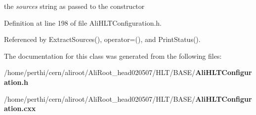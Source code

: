 the {\em sources\/} string as passed to the constructor 

Definition at line 198 of file Ali\-HLTConfiguration.h.

Referenced by Extract\-Sources(), operator=(), and Print\-Status().

The documentation for this class was generated from the following files:\begin{CompactItemize}
\item 
/home/perthi/cern/aliroot/Ali\-Root\_\-head020507/HLT/BASE/{\bf Ali\-HLTConfiguration.h}\item 
/home/perthi/cern/aliroot/Ali\-Root\_\-head020507/HLT/BASE/{\bf Ali\-HLTConfiguration.cxx}\end{CompactItemize}
